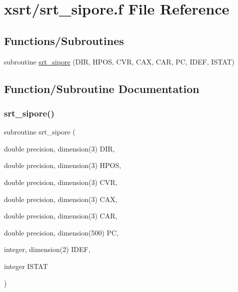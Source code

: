 \hypertarget{srt__sipore_8f}{}\section{xsrt/srt\+\_\+sipore.f File Reference}
\label{srt__sipore_8f}
\subsection*{Functions/\+Subroutines}
\begin{DoxyCompactItemize}
\item 
subroutine \hyperlink{srt__sipore_8f_aaa092a09b2c7ca77b2d082a751e2464f}{srt\+\_\+sipore} (D\+IR, H\+P\+OS, C\+VR, C\+AX, C\+AR, PC, I\+D\+EF, I\+S\+T\+AT)
\end{DoxyCompactItemize}


\subsection{Function/\+Subroutine Documentation}
\mbox{\label{srt__sipore_8f_aaa092a09b2c7ca77b2d082a751e2464f}} 
\subsubsection{\texorpdfstring{srt\+\_\+sipore()}{srt\_sipore()}}
{\footnotesize\ttfamily subroutine srt\+\_\+sipore (\begin{DoxyParamCaption}\item[{double precision, dimension(3)}]{D\+IR,  }\item[{double precision, dimension(3)}]{H\+P\+OS,  }\item[{double precision, dimension(3)}]{C\+VR,  }\item[{double precision, dimension(3)}]{C\+AX,  }\item[{double precision, dimension(3)}]{C\+AR,  }\item[{double precision, dimension(500)}]{PC,  }\item[{integer, dimension(2)}]{I\+D\+EF,  }\item[{integer}]{I\+S\+T\+AT }\end{DoxyParamCaption})}

